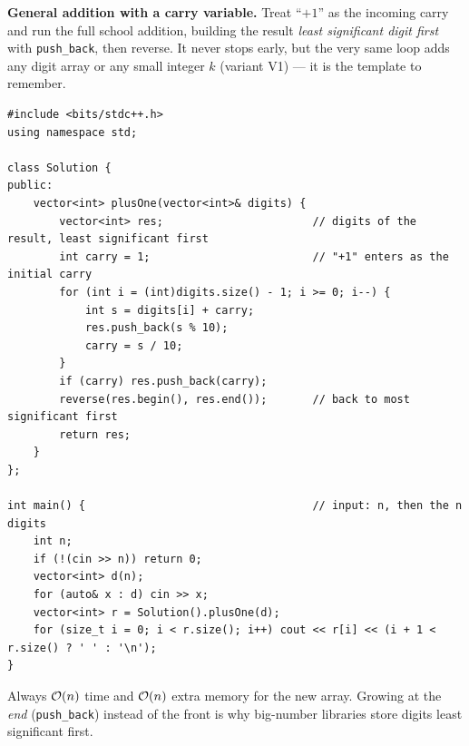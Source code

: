 \begin{alternativebox}
\textbf{General addition with a carry variable.} Treat ``$+1$'' as the incoming carry and run the full school addition, building the result \emph{least significant digit first} with \texttt{push\_back}, then reverse. It never stops early, but the very same loop adds any digit array or any small integer $k$ (variant V1) --- it is the template to remember.
\begin{lstlisting}[style=cpp]
#include <bits/stdc++.h>
using namespace std;

class Solution {
public:
    vector<int> plusOne(vector<int>& digits) {
        vector<int> res;                       // digits of the result, least significant first
        int carry = 1;                         // "+1" enters as the initial carry
        for (int i = (int)digits.size() - 1; i >= 0; i--) {
            int s = digits[i] + carry;
            res.push_back(s % 10);
            carry = s / 10;
        }
        if (carry) res.push_back(carry);
        reverse(res.begin(), res.end());       // back to most significant first
        return res;
    }
};

int main() {                                   // input: n, then the n digits
    int n;
    if (!(cin >> n)) return 0;
    vector<int> d(n);
    for (auto& x : d) cin >> x;
    vector<int> r = Solution().plusOne(d);
    for (size_t i = 0; i < r.size(); i++) cout << r[i] << (i + 1 < r.size() ? ' ' : '\n');
}
\end{lstlisting}
Always $\mathcal{O}(n)$ time and $\mathcal{O}(n)$ extra memory for the new array. Growing at the \emph{end} (\texttt{push\_back}) instead of the front is why big-number libraries store digits least significant first.

\begin{diagrambox}
\end{diagrambox}
\end{alternativebox}

